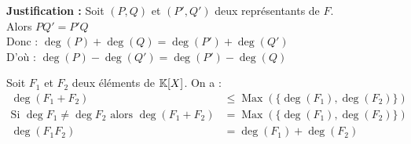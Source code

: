 \documentclass[12pt,twoside,a4paper]{article}
\DeclareMathOperator{\Max}{Max}
\begin{document}
	\textbf{Justification :} Soit $(P,Q)$ et $(P',Q')$ deux repr\'esentants de $F$. \\
	Alors $PQ'=P'Q$ \\
	Donc : $\deg(P)+\deg(Q)=\deg(P')+\deg(Q')$ \\
	D'o\`u : $\deg(P)-\deg(Q')=\deg(P')-\deg(Q)$
	\begin{prop}
		Soit $F_1$ et $F_2$ deux \'el\'ements de $\mathbb{K}[X]$. On a : \\
		$$\begin{aligned}
			\deg(F_1+F_2)&\leq\Max(\{\deg(F_1),\deg(F_2)\}) \\
			\text{Si }\deg{F_1}\neq\deg{F_2}\text{ alors }\deg(F_1+F_2)&=\Max(\{\deg(F_1),\deg(F_2)\}) \\
			\deg(F_1F_2)&=\deg(F_1)+\deg(F_2)
		\end{aligned}$$
	\end{prop}
\end{document}
